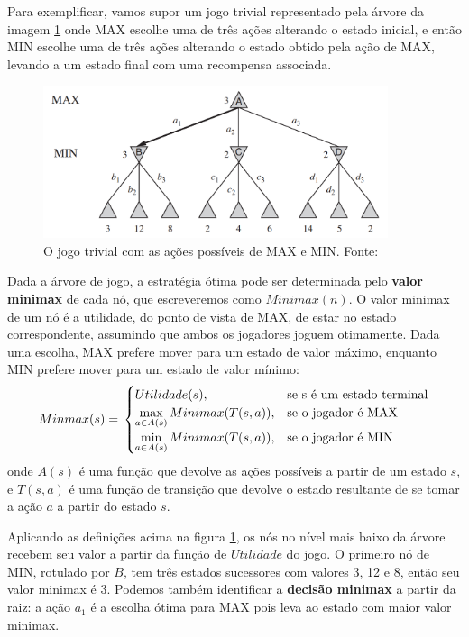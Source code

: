 Para exemplificar, vamos supor um jogo trivial representado pela árvore da imagem \ref{minimax} onde MAX escolhe uma de três ações alterando o estado inicial, e então MIN escolhe uma de três ações alterando o estado obtido pela ação de MAX, levando a um estado final com uma recompensa associada.

\begin{figure}[!h]
        \centering
            \includegraphics[width=0.9\textwidth]{picstcc/minimax.png}
            \caption{O jogo trivial com as ações possíveis de MAX e MIN. Fonte: \cite[p. 164]{livro}}
            \label{minimax}
\end{figure}

Dada a árvore de jogo, a estratégia ótima pode ser determinada pelo \textbf{valor minimax} de cada nó, que escreveremos como $Minimax(n)$. O valor minimax de um nó é a utilidade, do ponto de vista de MAX, de estar no estado correspondente, assumindo que ambos os jogadores joguem otimamente. Dada uma escolha, MAX prefere mover para um estado de valor máximo, enquanto MIN prefere mover para um estado de valor mínimo:
\begin{equation*}
  Minmax(s) = \\
  \begin{cases} Utilidade(s), &\textrm{se s é um estado terminal}\\
                \max\limits_{a\in A(s)}Minimax(T(s,a)), &\textrm{se o jogador é MAX}\\
                \min\limits_{a\in A(s)}Minimax(T(s,a)), &\textrm{se o jogador é MIN}\\
  \end{cases}
\end{equation*}
onde $A(s)$ é uma função que devolve as ações possíveis a partir de um estado $s$, e $T(s, a)$ é uma função de transição que devolve o estado resultante de se tomar a ação $a$ a partir do estado $s$.

Aplicando as definições acima na figura \ref{minimax}, os nós no nível mais baixo da árvore recebem seu valor a partir da função de $Utilidade$ do jogo. O primeiro nó de MIN, rotulado por $B$, tem três estados sucessores com valores 3, 12 e 8, então seu valor minimax é 3. Podemos também identificar a \textbf{decisão minimax} a partir da raiz: a ação $a_1$ é a escolha ótima para MAX pois leva ao estado com maior valor minimax.
